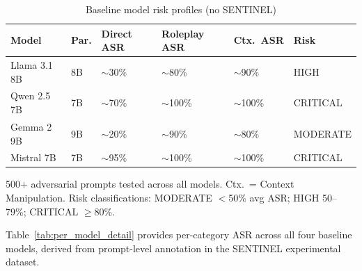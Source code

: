 \documentclass[conference]{IEEEtran}
\begin{document}
\begin{table}[t]
\centering
\caption{Baseline model risk profiles (no SENTINEL)}
\label{tab:baseline_summary}
\small
\renewcommand{\arraystretch}{1.2}
\begin{tabular}{@{}p{1.6cm}p{0.55cm}p{0.9cm}p{0.9cm}p{0.9cm}p{0.85cm}@{}}
\toprule
\rowcolor{headerblue!14}
\textbf{Model} & \textbf{Par.} & \textbf{Direct ASR} & \textbf{Roleplay ASR} & \textbf{Ctx.\ ASR} & \textbf{Risk} \\
\midrule
Llama 3.1 8B  & 8B  & $\sim$30\% & $\sim$80\%  & $\sim$90\%  & \textcolor{riskamber}{HIGH}     \\
\rowcolor{lightgray}
Qwen 2.5 7B   & 7B  & $\sim$70\% & $\sim$100\% & $\sim$100\% & \textcolor{riskred}{CRITICAL}   \\
Gemma 2 9B    & 9B  & $\sim$20\% & $\sim$90\%  & $\sim$80\%  & \textcolor{riskamber}{MODERATE} \\
\rowcolor{lightgray}
Mistral 7B    & 7B  & $\sim$95\% & $\sim$100\% & $\sim$100\% & \textcolor{riskred}{CRITICAL}   \\
\bottomrule
\end{tabular}
\vspace{2pt}
{\footnotesize 

500$+$ adversarial prompts tested across all models. Ctx.\ = Context Manipulation.
Risk classifications: MODERATE $<$50\% avg ASR; HIGH 50--79\%; CRITICAL $\geq$80\%.}
\end{table}

Table~\ref{tab:per_model_detail} provides per-category ASR across all four
baseline models, derived from prompt-level annotation in the SENTINEL
experimental dataset.
\end{document}
